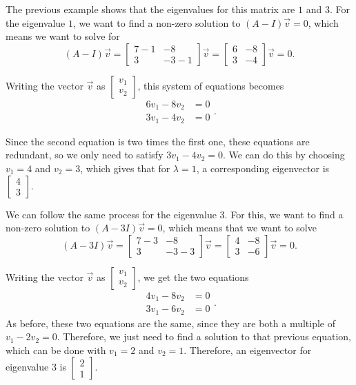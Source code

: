 \begin{exampleSol}
The previous example shows that the eigenvalues for this matrix are $1$ and $3$. For the eigenvalue $1$, we want to find a non-zero solution to $(A - I)\vec{v} = 0$, which means we want to solve for
\[ (A - I)\vec{v} = \begin{bmatrix} 7-1 & -8 \\ 3 & -3-1 \end{bmatrix}\vec{v} = \begin{bmatrix} 6 & -8 \\ 3 & -4 \end{bmatrix}\vec{v}= 0. \]

Writing the vector $\vec{v}$ as $\begin{bmatrix} v_1 \\ v_2 \end{bmatrix}$, this system of equations becomes
\begin{equation*} 
\begin{split}
6v_1 - 8v_2 &= 0 \\
3v_1 - 4v_2 &= 0
\end{split}.
\end{equation*}

Since the second equation is two times the first one, these equations are redundant, so we only need to satisfy $3v_1 - 4v_2 = 0$. We can do this by choosing $v_1 = 4$ and $v_2 = 3$, which gives that for $\lambda = 1$, a corresponding eigenvector is $\begin{bmatrix} 4 \\ 3 \end{bmatrix}$. 

We can follow the same process for the eigenvalue $3$. For this, we want to find a non-zero solution to $(A - 3I)\vec{v} = 0$, which means that we want to solve 
\begin{equation*} (A - 3I)\vec{v} = \begin{bmatrix} 7-3 & -8 \\ 3 & -3-3 \end{bmatrix}\vec{v} = \begin{bmatrix} 4 & -8 \\ 3 & -6 \end{bmatrix}\vec{v}= 0. \end{equation*}

Writing the vector $\vec{v}$ as $\begin{bmatrix} v_1 \\ v_2 \end{bmatrix}$, we get the two equations
\[
\begin{split}
4v_1 - 8v_2 &= 0 \\
3v_1 - 6v_2 &= 0
\end{split}.
\]
As before, these two equations are the same, since they are both a multiple of $v_1 - 2v_2 = 0$. Therefore, we just need to find a solution to that previous equation, which can be done with $v_1 = 2$ and $v_2 = 1$. Therefore, an eigenvector for eigenvalue $3$ is $\begin{bmatrix} 2 \\ 1 \end{bmatrix}$. 
\end{exampleSol}

